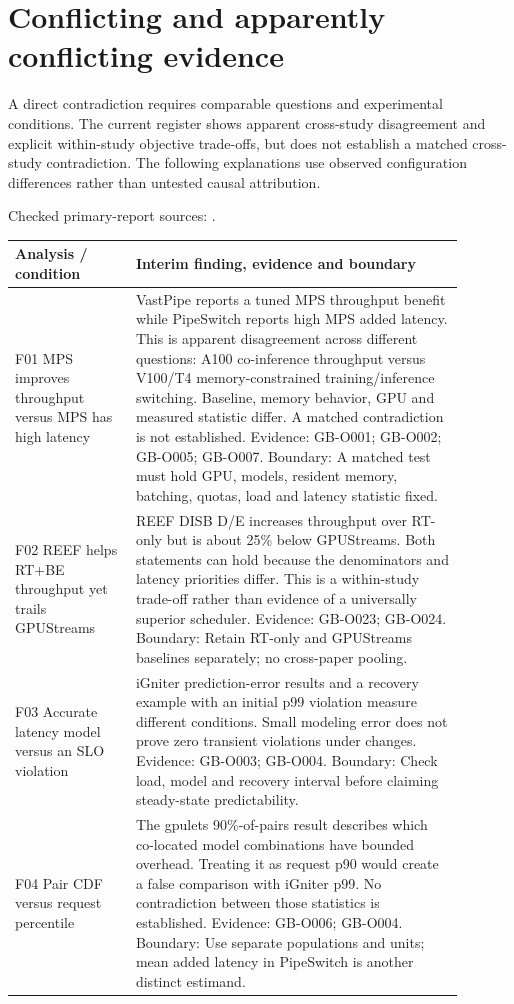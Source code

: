 \documentclass[12pt,a4paper]{article}
\begin{document}
\section{Conflicting and apparently conflicting evidence}
A direct contradiction requires comparable questions and experimental conditions. The current register shows apparent cross-study disagreement and explicit within-study objective trade-offs, but does not establish a matched cross-study contradiction. The following explanations use observed configuration differences rather than untested causal attribution.


Checked primary-report sources: \cite{vastpipe,igniter,gpulets,pipeswitch,reef}. 
\begin{longtable}{p{0.24\linewidth}p{0.65\linewidth}}
\toprule
Analysis /\allowbreak{} condition & Interim finding, evidence and boundary\\\midrule
\endhead
F01 MPS improves throughput versus MPS has high latency & VastPipe reports a tuned MPS throughput benefit while PipeSwitch reports high MPS added latency. This is apparent disagreement across different questions: A100 co-inference throughput versus V100/\allowbreak{}T4 memory-constrained training/\allowbreak{}inference switching. Baseline, memory behavior, GPU and measured statistic differ. A matched contradiction is not established. Evidence: GB-O001; GB-O002; GB-O005; GB-O007. Boundary: A matched test must hold GPU, models, resident memory, batching, quotas, load and latency statistic fixed.\\
F02 REEF helps RT+BE throughput yet trails GPUStreams & REEF DISB D/\allowbreak{}E increases throughput over RT-only but is about 25\% below GPUStreams. Both statements can hold because the denominators and latency priorities differ. This is a within-study trade-off rather than evidence of a universally superior scheduler. Evidence: GB-O023; GB-O024. Boundary: Retain RT-only and GPUStreams baselines separately; no cross-paper pooling.\\
F03 Accurate latency model versus an SLO violation & iGniter prediction-error results and a recovery example with an initial p99 violation measure different conditions. Small modeling error does not prove zero transient violations under changes. Evidence: GB-O003; GB-O004. Boundary: Check load, model and recovery interval before claiming steady-state predictability.\\
F04 Pair CDF versus request percentile & The gpulets 90\%-of-pairs result describes which co-located model combinations have bounded overhead. Treating it as request p90 would create a false comparison with iGniter p99. No contradiction between those statistics is established. Evidence: GB-O006; GB-O004. Boundary: Use separate populations and units; mean added latency in PipeSwitch is another distinct estimand.\\
\bottomrule
\end{longtable}
\end{document}
